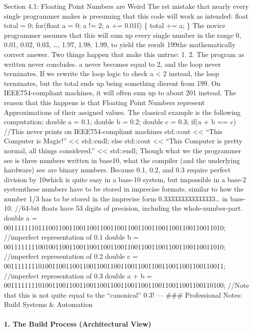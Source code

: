 Section 4.1: Floating Point Numbers are Weird The rst mistake that
nearly every single programmer makes is presuming that this code will
work as intended: float total = 0; for(float a = 0; a != 2; a += 0.01f)
\{ total += a; \} The novice programmer assumes that this will sum up
every single number in the range 0, 0.01, 0.02, 0.03, \ldots, 1.97,
1.98, 1.99, to yield the result 199the mathematically correct answer.
Two things happen that make this untrue: 1. 2. The program as written
never concludes. a never becomes equal to 2, and the loop never
terminates. If we rewrite the loop logic to check a \textless{} 2
instead, the loop terminates, but the total ends up being something
dierent from 199. On IEEE754-compliant machines, it will often sum up to
about 201 instead. The reason that this happens is that Floating Point
Numbers represent Approximations of their assigned values. The classical
example is the following computation: double a = 0.1; double b = 0.2;
double c = 0.3; if(a + b == c) //This never prints on IEEE754-compliant
machines std::cout \textless\textless{} ``This Computer is Magic!''
\textless\textless{} std::endl; else std::cout \textless\textless{}
``This Computer is pretty normal, all things considered.''
\textless\textless{} std::endl; Though what we the programmer see is
three numbers written in base10, what the compiler (and the underlying
hardware) see are binary numbers. Because 0.1, 0.2, and 0.3 require
perfect division by 10which is quite easy in a base-10 system, but
impossible in a base-2 systemthese numbers have to be stored in
imprecise formats, similar to how the number 1/3 has to be stored in the
imprecise form 0.333333333333333\ldots{} in base-10. //64-bit floats
have 53 digits of precision, including the whole-number-part. double a =
0011111110111001100110011001100110011001100110011001100110011010;
//imperfect representation of 0.1 double b =
0011111111001001100110011001100110011001100110011001100110011010;
//imperfect representation of 0.2 double c =
0011111111010011001100110011001100110011001100110011001100110011;
//imperfect representation of 0.3 double a + b =
0011111111010011001100110011001100110011001100110011001100110100; //Note
that this is not quite equal to the ``canonical'' 0.3! --- \#\#\#
Professional Notes: Build Systems \& Automation

\hypertarget{the-build-process-architectural-view}{%
\paragraph{1. The Build Process (Architectural
View)}\label{the-build-process-architectural-view}}

